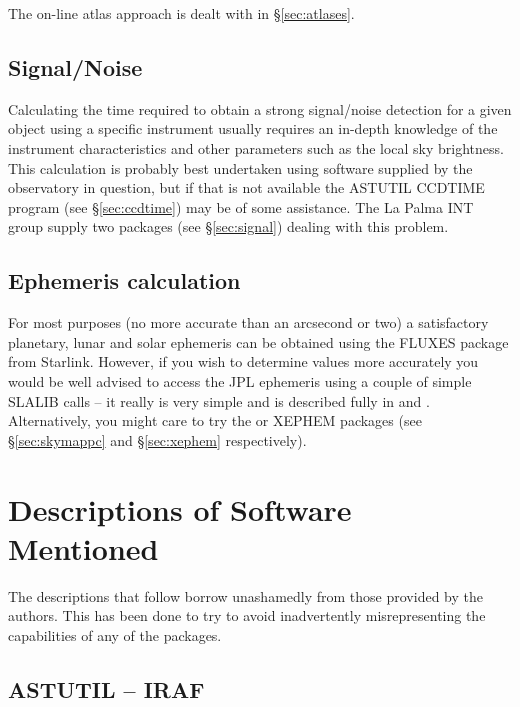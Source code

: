The on-line atlas approach is dealt with in \S{\ref{sec:atlases}}.

\subsection{Signal/Noise} 
\label{sec:sn}

Calculating the time required to obtain a strong signal/noise detection
for a given object using a specific instrument usually requires an 
in-depth knowledge of the instrument characteristics and other 
parameters such as the local sky brightness. This calculation is probably 
best undertaken using software supplied by the observatory in question, but 
if that is not available the ASTUTIL CCDTIME program (see \S{\ref{sec:ccdtime}})
may be of some assistance. The 
La Palma INT group supply two packages (see \S{\ref{sec:signal}}) dealing 
with this problem.
  
\subsection{Ephemeris calculation} 
\label{sec:eph}

For most purposes (no more accurate than an arcsecond or two) a satisfactory 
planetary, lunar and solar ephemeris can be obtained using the FLUXES
package from Starlink.
However, if you wish to determine values more accurately you
would be well advised to access the JPL ephemeris using a couple of
simple SLALIB calls -- it really is very simple and is described fully
in {\JPLref} and {\SLALIBref}. Alternatively, you might care to try the {\SKYMAPPCref} or 
XEPHEM packages (see \S{\ref{sec:skymappc}} and \S{\ref{sec:xephem}} respectively).

\section{Descriptions of Software Mentioned} 
\label{sec:desoft} 

The descriptions that follow borrow unashamedly from those provided by
the authors. This has been done to try to avoid inadvertently misrepresenting
the capabilities of any of the packages.

\subsection{ASTUTIL -- IRAF} 
\label{sec:astutil} 


